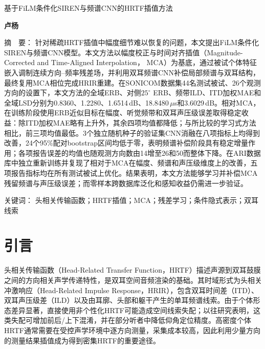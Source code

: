 \documentclass[UTF8,a4paper]{article}
\newenvironment{csmtAbstract}{\par\noindent\kaishu\small{\heiti 摘~~要：}}{\par}
\newenvironment{keywords}{\par\smallskip\noindent\songti\small{\heiti 关键词：}}{\par}
\begin{document}
\begin{center}
{\heiti{}基于FiLM条件化SIREN与频谱CNN的HRTF插值方法\par}
\vspace{1em}
{\kaishu{}\textbf{卢杨}\par}
\vspace{0.6em}
\end{center}

\begin{csmtAbstract}
针对稀疏HRTF插值中幅度细节难以恢复的问题，本文提出FiLM条件化SIREN与频谱CNN模型。本文方法以幅度校正与时间对齐插值（Magnitude-Corrected and Time-Aligned Interpolation，
MCA）为基底，通过被试个体特征嵌入调制连续方向--频率残差场，并利用双耳频谱CNN补偿局部频谱与双耳结构，最终复用MCA相位完成HRIR重建。在SONICOM数据集44名测试被试、26个观测方向的设置下，本文方法的全域ERB、对侧$25^\circ$ ERB、频带ILD、ITD加权MAE和全域LSD分别为0.8360、1.2280、1.6514\,dB、18.8480\,$\mu$s和3.6029\,dB。相对MCA，在训练阶段使用ERB近似目标在幅度、听觉频带和双耳声压级误差取得稳定收益：除ITD加权MAE略有上升外，其余四项均值都降低；与所比较的学习式方法相比，前三项均值最低。3个独立随机种子的验证集CNN消融在八项指标上均得到改善，24个95\%配对bootstrap区间均低于零，表明频谱补偿阶段具有稳定增量作用；各项报告误差的均值也随观测方向数由14增至26和50而整体下降。在ARI数据库中独立重新训练并复现了相对于MCA在幅度、频谱和声压级维度上的改善，五项报告指标均在所有测试被试上优化。结果表明，本文方法能够学习并补偿MCA残留频谱与声压级误差；而零样本跨数据库泛化和感知收益仍需进一步验证。
\end{csmtAbstract}

\begin{keywords}
头相关传输函数；HRTF插值；MCA；残差学习；条件隐式表示；双耳线索
\end{keywords}

\section{引言}
\label{sec:introduction}

头相关传输函数（Head-Related Transfer Function，HRTF）描述声源到双耳鼓膜之间的方向相关声学传递特性，是双耳空间音频渲染的基础。其时域形式为头相关冲激响应（Head-Related Impulse Response，HRIR），包含双耳时间差（ITD）、双耳声压级差（ILD）以及由耳廓、头部和躯干产生的单耳频谱线索\cite{R6}。由于个体形态差异显著，直接使用非个性化HRTF可能造成空间线索失配；以往研究表明，这类失配可增加前后/上下混淆，并在部分听者中降低仰角定位精度\cite{R27}。高密度个体HRTF通常需要在受控声学环境中逐方向测量，采集成本较高，因此利用少量方向的测量结果插值成为得到密集HRTF的重要途径\cite{R13}。
\end{document}
